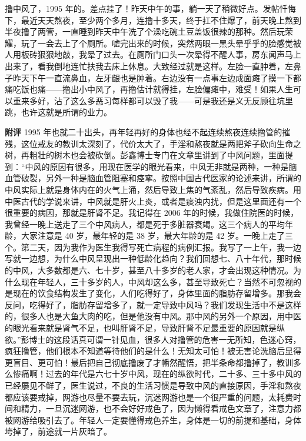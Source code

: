\begin{case}
    撸中风了，1995 年的。差点挂了！昨天中午的事，躺一天了稍微好点。发帖忏悔下，最近天天熬夜，至少两个多月，连撸十多天，终于扛不住爆了，前天晚上熬到半夜撸了两管，一直睡到昨天中午洗了个澡吃碗土豆盖饭很辣的那种。然后玩荣耀，玩了一会去上了个厕所。嘘完出来的时候，突然两眼一黑头晕乎乎的脸感觉被人用板砖狠狠地敲，我晕了过去。在厕所门口头一次晕得不醒人事，房东闻声马上出来了，看我倒地连忙扶我去床上休息。大致经过就是这样。左脸一直肿着，左鼻子昨天下午一直流鼻血，左牙龈也是肿着。右边没有一点事左边成面瘫了摸一下都痛吃饭也痛——撸出小中风了，再撸估计就得挂，左脸偏瘫中，难受！如果人生可以重来多好，沾了这么多恶习每样都可以毁了我——可是我还是义无反顾往坑里跳，也许这就是所谓的业力。

    \textbf{附评} 1995 年也就二十出头，再年轻再好的身体也经不起连续熬夜连续撸管的摧残，这位戒友的教训太深刻了，代价太大了，手淫和熬夜就是两把斧子砍向生命之树，再粗壮的树木也会被砍倒。彭鑫博士专门在文章里讲到了中风问题，里面提到：“中风的原因有很多，用现在医学的眼光看来，中风无非就是两种，一种是脑血管破裂，另外一种是脑血管阻塞和痉挛。按照中国古代医家的论述来讲，所谓的中风实际上就是身体内在的火气上涌，然后导致上焦的气紊乱，然后导致疾病。用中医古代的学说来讲，中风就是肝火上炎，或者是痰浊内扰，但是这里面还有一个很重要的病因，那就是肝肾不足。我记得在 2006 年的时候，我做住院医的时候，我曾经一晚上送走了三个中风病人，都是死于多脏器衰竭。这三个病人的平均年龄，大家注意是 40 岁，最年轻的是 38 岁，最大年龄的是 42 岁。一晚上走了三个。第二天，因为我作为医生我得写死亡病程的病例汇报。我写了一上午，我一边写就一边想，为什么中风呈现出一种低龄化趋向？我们回想七、八十年代，那时候的中风，大多数都是六、七十岁，甚至八十多岁的老人家，才会出现这种情况。为什么现在年轻人，三十多岁的人，中风却这么多，甚至导致死亡？当然不可忽视的是现在的饮食结构发生了变化，人们吃得好了，身体里面的脂肪存留增多。那我会反问，吃得好了，脂肪存留增多了，就一定导致中风吗？我们发现生活中不是这样的，很多人也是大鱼大肉的吃，但是他没有中风。那中风的另外一个原因，用中医的眼光看来就是肾气不足，也叫肝肾不足，导致肝肾不足最重要的原因就是纵欲。”彭博士的这段话真可谓一针见血，很多人对撸管的危害一无所知，色迷心窍，疯狂撸管，他们根本不知道等待他们的是什么！无知太可怕！被无害论洗脑后显得更盲目、更可怕！最后把自己彻底撸废了才幡然醒悟，把半条命都撸掉了，教训多么惨痛啊！过去的年代是六七十岁中风，现在的纵欲时代，二十多、三十多中风的已经屡见不鲜了，医生说过，不良的生活习惯是导致中风的直接原因，手淫和熬夜都应该要戒掉，网游也尽量不要去玩，沉迷网游也是一个很严重的问题，太耗费时间和精力，一旦沉迷网游，也不会好好戒色了，因为懒得看戒色文章了，注意力都被网游给吸引去了。年轻人一定要懂得戒色养生，身体是一切的前提和基础，身体垮掉了，前途就一片灰暗了。
\end{case}

